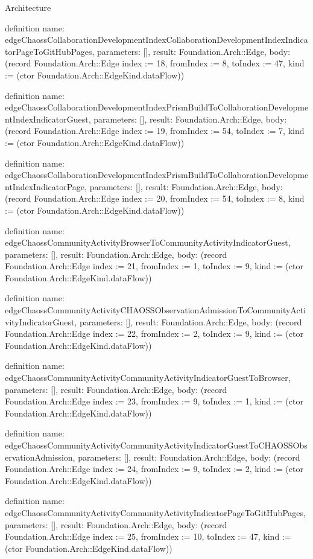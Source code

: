 \begin{lexlean}{Architecture}
\begin{semanticmodule}
definition{
  name: edgeChaossCollaborationDevelopmentIndexCollaborationDevelopmentIndexIndicatorPageToGitHubPages,
  parameters: [],
  result: Foundation.Arch::Edge,
  body: (record Foundation.Arch::Edge {index := 18, fromIndex := 8, toIndex := 47, kind := (ctor Foundation.Arch::EdgeKind.dataFlow)})
}

definition{
  name: edgeChaossCollaborationDevelopmentIndexPrismBuildToCollaborationDevelopmentIndexIndicatorGuest,
  parameters: [],
  result: Foundation.Arch::Edge,
  body: (record Foundation.Arch::Edge {index := 19, fromIndex := 54, toIndex := 7, kind := (ctor Foundation.Arch::EdgeKind.dataFlow)})
}

definition{
  name: edgeChaossCollaborationDevelopmentIndexPrismBuildToCollaborationDevelopmentIndexIndicatorPage,
  parameters: [],
  result: Foundation.Arch::Edge,
  body: (record Foundation.Arch::Edge {index := 20, fromIndex := 54, toIndex := 8, kind := (ctor Foundation.Arch::EdgeKind.dataFlow)})
}

definition{
  name: edgeChaossCommunityActivityBrowserToCommunityActivityIndicatorGuest,
  parameters: [],
  result: Foundation.Arch::Edge,
  body: (record Foundation.Arch::Edge {index := 21, fromIndex := 1, toIndex := 9, kind := (ctor Foundation.Arch::EdgeKind.dataFlow)})
}

definition{
  name: edgeChaossCommunityActivityCHAOSSObservationAdmissionToCommunityActivityIndicatorGuest,
  parameters: [],
  result: Foundation.Arch::Edge,
  body: (record Foundation.Arch::Edge {index := 22, fromIndex := 2, toIndex := 9, kind := (ctor Foundation.Arch::EdgeKind.dataFlow)})
}

definition{
  name: edgeChaossCommunityActivityCommunityActivityIndicatorGuestToBrowser,
  parameters: [],
  result: Foundation.Arch::Edge,
  body: (record Foundation.Arch::Edge {index := 23, fromIndex := 9, toIndex := 1, kind := (ctor Foundation.Arch::EdgeKind.dataFlow)})
}

definition{
  name: edgeChaossCommunityActivityCommunityActivityIndicatorGuestToCHAOSSObservationAdmission,
  parameters: [],
  result: Foundation.Arch::Edge,
  body: (record Foundation.Arch::Edge {index := 24, fromIndex := 9, toIndex := 2, kind := (ctor Foundation.Arch::EdgeKind.dataFlow)})
}

definition{
  name: edgeChaossCommunityActivityCommunityActivityIndicatorPageToGitHubPages,
  parameters: [],
  result: Foundation.Arch::Edge,
  body: (record Foundation.Arch::Edge {index := 25, fromIndex := 10, toIndex := 47, kind := (ctor Foundation.Arch::EdgeKind.dataFlow)})
}


\end{semanticmodule}
\end{lexlean}
